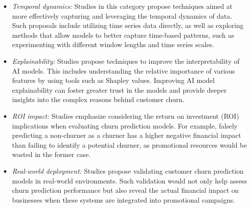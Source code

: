 \documentclass[preprint,12pt]{elsarticle}
\begin{document}
\begin{itemize}
    \item \textit{Temporal dynamics:} Studies in this category propose techniques aimed at more effectively capturing and leveraging the temporal dynamics of data. Such proposals include utilizing time series data directly, as well as exploring methods that allow models to better capture time-based patterns, such as experimenting with different window lengths and time series scales.
    

    \item \textit{Explainability:} Studies propose techniques to improve the interpretability of AI models. This includes understanding the relative importance of various features by using tools such as Shapley values. Improving AI model explainability can foster greater trust in the models and provide deeper insights into the complex reasons behind customer churn.

    \item \textit{ROI impact:} Studies emphasize considering the return on investment (ROI) implications when evaluating churn prediction models. For example, falsely predicting a non-churner as a churner has a higher negative financial impact than failing to identify a potential churner, as promotional resources would be wasted in the former case.
    
    \item \textit{Real-world deployment:} Studies propose validating customer churn prediction models in real-world environments. Such validation would not only help assess churn prediction performance but also reveal the actual financial impact on businesses when these systems are integrated into promotional campaigns.
    
\end{itemize}


\end{document}
